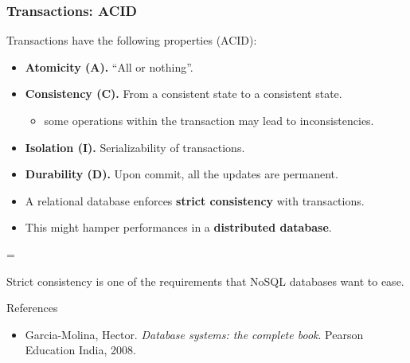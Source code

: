 \documentclass[xcolor=table]{beamer}
\newenvironment{warning}
  {\par\begin{mdframed}[linewidth=2pt,linecolor=darkred]%
    \begin{list}{}{\leftmargin=1cm
                   \labelwidth=\leftmargin}\item[\Large\ding{43}]}
  {\end{list}\end{mdframed}\par}
\begin{document}
  \begin{frame}
  \frametitle{Transactions: ACID}
  Transactions have the following properties (ACID):
  \begin{itemize}
  \item \textbf{Atomicity (A).} ``All or nothing''.
  \item \textbf{Consistency (C).} From a consistent state to a consistent state.
  \begin{itemize}
  \item some  operations within the transaction may lead to inconsistencies.
  \end{itemize}
  \item \textbf{Isolation (I).}  Serializability of transactions.
  \item \textbf{Durability (D).} Upon commit, all the updates are permanent.
  \end{itemize}
  \begin{itemize}
    \item A relational database enforces \textbf{strict consistency} with transactions.
    \item This might hamper performances in a \textbf{distributed database}.
  \end{itemize}
  \vfill
  \begin{warning}
    Strict consistency is one of the requirements that NoSQL databases 
    want to ease.
  \end{warning}
  \end{frame}
    



\begin{frame}{References}
  \begin{itemize}
    \item Garcia-Molina, Hector. {\em Database systems: the complete book}. Pearson Education India, 2008.\href{http://infolab.stanford.edu/~ullman/dscb.html}{}
  \end{itemize}
\end{frame}
\end{document}
